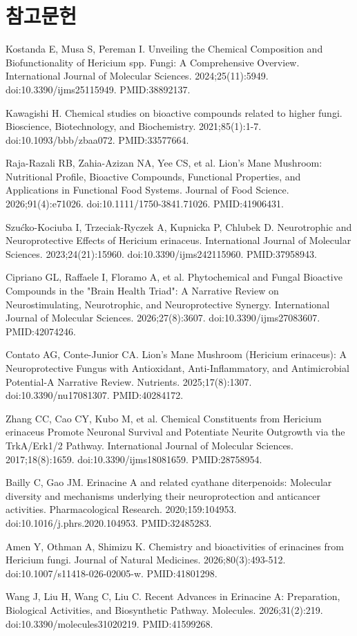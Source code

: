 \documentclass[11pt,oneside]{book}
\newcommand{\refstart}{\par\begingroup\footnotesize\setlength{\parskip}{2.5pt}\raggedright}
\newcommand{\reff}[2]{\par\hangindent=7mm\hangafter=1\noindent[#1]\hspace{2mm}#2\par}
\begin{document}
\section*{참고문헌}
\refstart
\reff{1}{Kostanda E, Musa S, Pereman I. Unveiling the Chemical Composition and Biofunctionality of Hericium spp. Fungi: A Comprehensive Overview. International Journal of Molecular Sciences. 2024;25(11):5949. doi:10.3390/ijms25115949. PMID:38892137.}
\reff{2}{Kawagishi H. Chemical studies on bioactive compounds related to higher fungi. Bioscience, Biotechnology, and Biochemistry. 2021;85(1):1-7. doi:10.1093/bbb/zbaa072. PMID:33577664.}
\reff{3}{Raja-Razali RB, Zahia-Azizan NA, Yee CS, et al. Lion's Mane Mushroom: Nutritional Profile, Bioactive Compounds, Functional Properties, and Applications in Functional Food Systems. Journal of Food Science. 2026;91(4):e71026. doi:10.1111/1750-3841.71026. PMID:41906431.}
\reff{4}{Szućko-Kociuba I, Trzeciak-Ryczek A, Kupnicka P, Chlubek D. Neurotrophic and Neuroprotective Effects of Hericium erinaceus. International Journal of Molecular Sciences. 2023;24(21):15960. doi:10.3390/ijms242115960. PMID:37958943.}
\reff{5}{Cipriano GL, Raffaele I, Floramo A, et al. Phytochemical and Fungal Bioactive Compounds in the "Brain Health Triad": A Narrative Review on Neurostimulating, Neurotrophic, and Neuroprotective Synergy. International Journal of Molecular Sciences. 2026;27(8):3607. doi:10.3390/ijms27083607. PMID:42074246.}
\reff{6}{Contato AG, Conte-Junior CA. Lion's Mane Mushroom (Hericium erinaceus): A Neuroprotective Fungus with Antioxidant, Anti-Inflammatory, and Antimicrobial Potential-A Narrative Review. Nutrients. 2025;17(8):1307. doi:10.3390/nu17081307. PMID:40284172.}
\reff{7}{Zhang CC, Cao CY, Kubo M, et al. Chemical Constituents from Hericium erinaceus Promote Neuronal Survival and Potentiate Neurite Outgrowth via the TrkA/Erk1/2 Pathway. International Journal of Molecular Sciences. 2017;18(8):1659. doi:10.3390/ijms18081659. PMID:28758954.}
\reff{8}{Bailly C, Gao JM. Erinacine A and related cyathane diterpenoids: Molecular diversity and mechanisms underlying their neuroprotection and anticancer activities. Pharmacological Research. 2020;159:104953. doi:10.1016/j.phrs.2020.104953. PMID:32485283.}
\reff{9}{Amen Y, Othman A, Shimizu K. Chemistry and bioactivities of erinacines from Hericium fungi. Journal of Natural Medicines. 2026;80(3):493-512. doi:10.1007/s11418-026-02005-w. PMID:41801298.}
\reff{10}{Wang J, Liu H, Wang C, Liu C. Recent Advances in Erinacine A: Preparation, Biological Activities, and Biosynthetic Pathway. Molecules. 2026;31(2):219. doi:10.3390/molecules31020219. PMID:41599268.}
\end{document}
